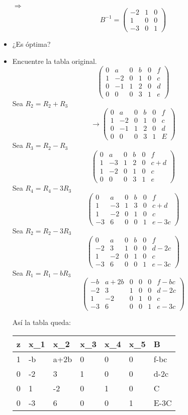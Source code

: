 \begin{itemize}
    $\Rightarrow$
    $$B^{-1}=\begin{pmatrix}-2&1&0\\ 1&0&0\\ -3&0&1\end{pmatrix}$$

    \item ¿Es óptima?
    \item Encuentre la tabla original.
    $$\begin{pmatrix}0&a&0&b&0&f\\ 1&-2&0&1&0&c\\ 0&-1&1&2&0&d\\ 0&0&0&3&1&e\end{pmatrix}$$
    Sea $R_2=R_2+R_3$
    $$\rightarrow \begin{pmatrix}0&a&0&b&0&f\\ 1&-2&0&1&0&c\\ 0&-1&1&2&0&d\\ 0&0&0&3&1&E\end{pmatrix}$$
    Sea $R_3=R_2-R_3$
    $$\begin{pmatrix}0&a&0&b&0&f\\ 1&-3&1&2&0&c+d\\ 1&-2&0&1&0&c\\ 0&0&0&3&1&e\end{pmatrix}$$
    Sea $R_4=R_4-3R_3$
    $$\begin{pmatrix}0&a&0&b&0&f\\ 1&-3&1&3&0&c+d\\ 1&-2&0&1&0&c\\ -3&6&0&0&1&e-3c\end{pmatrix}$$
    Sea $R_2=R_2-3R_3$
    $$\begin{pmatrix}0&a&0&b&0&f\\ -2&3&1&0&0&d-2c\\ 1&-2&0&1&0&c\\ -3&6&0&0&1&e-3c\end{pmatrix}$$
    Sea $R_1=R_1-bR_3$
    $$\begin{pmatrix}-b&a+2b&0&0&0&f-bc\\ -2&3&1&0&0&d-2c\\ 1&-2&0&1&0&c\\ -3&6&0&0&1&e-3c\end{pmatrix}$$
    
    Así la tabla queda:
    
    \begin{center}
        \begin{tabular}{|l|l|l|l|l|l|l|}
\hline
z & x_1 & x_2  & x_3 & x_4 & x_5 & B    \\ \hline
1 & -b  & a+2b & 0   & 0   & 0   & f-bc \\ \hline
0 & -2  & 3    & 1   & 0   & 0   & d-2c \\ \hline
0 & 1   & -2   & 0   & 1   & 0   & C    \\ \hline
0 & -3  & 6    & 0   & 0   & 1   & E-3C \\ \hline
\end{tabular}
    \end{center}

\end{itemize}


            